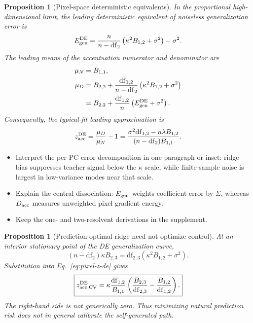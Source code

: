 \documentclass[11pt]{article}
\newtheorem{proposition}[theorem]{Proposition}
\begin{document}
\begin{proposition}[Pixel-space deterministic equivalents]
\label{prop:pixel-de}
In the proportional high-dimensional limit, the leading deterministic
equivalent of noiseless generalization error is
\begin{equation}
  E_{\rm gen}^{\rm DE}
  =\frac{n}{n-\mathrm{df}_{2}}
     \left(\kappa^2 B_{1,2}+\sigma^2\right)-\sigma^2.
  \label{eq:pixel-egen-de}
\end{equation}
The leading means of the accentuation numerator and denominator are
\begin{align}
  \mu_N
    &=B_{1,1},\label{eq:pixel-mu-n}\\
  \mu_D
    &=B_{2,2}
      +\frac{\mathrm{df}_{1,2}}{n-\mathrm{df}_{2}}
        \left(\kappa^2B_{1,2}+\sigma^2\right)\label{eq:pixel-mu-d}\\
    &=B_{2,2}
      +\frac{\mathrm{df}_{1,2}}{n}
       \left(E_{\rm gen}^{\rm DE}+\sigma^2\right).
\end{align}
Consequently, the typical-fit leading approximation is
\begin{equation}
  z_{\rm acc}^{\rm DE}
  =\frac{\mu_D}{\mu_N}-1
  =\frac{\sigma^2\mathrm{df}_{1,2}-n\lambda B_{1,2}}
         {(n-\mathrm{df}_{2})B_{1,1}}.
  \label{eq:pixel-z-de}
\end{equation}
\end{proposition}

\begin{itemize}
  \item Interpret the per-PC error decomposition in one paragraph or inset:
        ridge bias suppresses teacher signal below the $\kappa$ scale, while
        finite-sample noise is largest in low-variance modes near that scale.
  \item Explain the central dissociation: $E_{\rm gen}$ weights coefficient
        error by $\Sigma$, whereas $D_{\rm acc}$ measures unweighted pixel
        gradient energy.
  \item Keep the one- and two-resolvent derivations in the supplement.
\end{itemize}

\begin{proposition}[Prediction-optimal ridge need not optimize control]
\label{prop:pixel-cv}
At an interior stationary point of the DE generalization curve,
\begin{equation}
  (n-\mathrm{df}_{2})\kappa B_{2,3}
  =\mathrm{df}_{2,3}\left(\kappa^2B_{1,2}+\sigma^2\right).
  \label{eq:pixel-cv-stationary}
\end{equation}
Substitution into Eq.~\eqref{eq:pixel-z-de} gives
\begin{equation}
  \boxed{
  z_{\rm acc,CV}^{\rm DE}
  =\kappa\frac{\mathrm{df}_{1,2}}{B_{1,1}}
   \left(
     \frac{B_{2,3}}{\mathrm{df}_{2,3}}
     -\frac{B_{1,2}}{\mathrm{df}_{1,2}}
   \right).}
  \label{eq:pixel-z-cv}
\end{equation}
The right-hand side is not generically zero. Thus minimizing natural
prediction risk does not in general calibrate the self-generated path.
\end{proposition}
\end{document}
